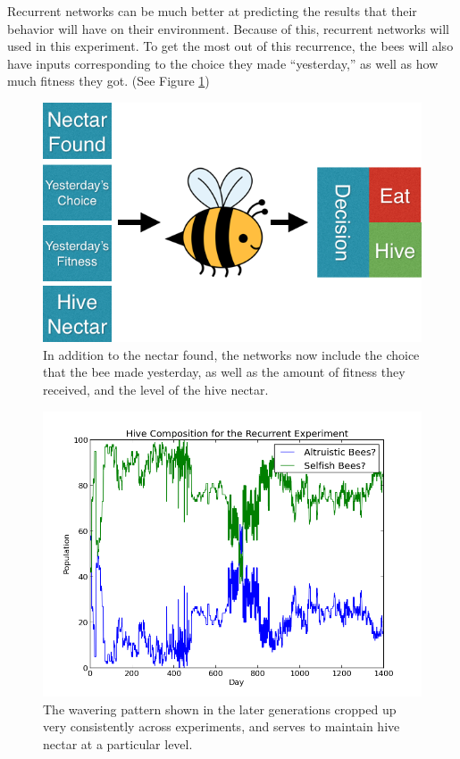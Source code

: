 \documentclass[twoside]{article}
\begin{document}
\begin{multicols}{2}
			Recurrent networks can be much better at predicting the results that their behavior will have on their environment. Because of this, recurrent networks will used in this experiment. To get the most out of this recurrence, the bees will also have inputs corresponding to the choice they made ``yesterday,'' as well as how much fitness they got. (See Figure \ref{fig:recurrent_system})


			\begin{figure}[H]
				\begin{center}
					\includegraphics[width=.45\textwidth]{bee_diagrams/recurrent_system.png}
				\end{center}
				\caption{In addition to the nectar found, the networks now include the choice that the bee made yesterday, as well as the amount of fitness they received, and the level of the hive nectar.}
				\label{fig:recurrent_system}
			\end{figure}

			\begin{figure}[H]
				\begin{center}
					\includegraphics[width=.5\textwidth]{results/recurrent_comp.png}
				\end{center}
				\caption{The wavering pattern shown in the later generations cropped up very consistently across experiments, and serves to maintain hive nectar at a particular level.}
				\label{fig:recurrent_composition}
			\end{figure}


\end{multicols}
\end{document}
